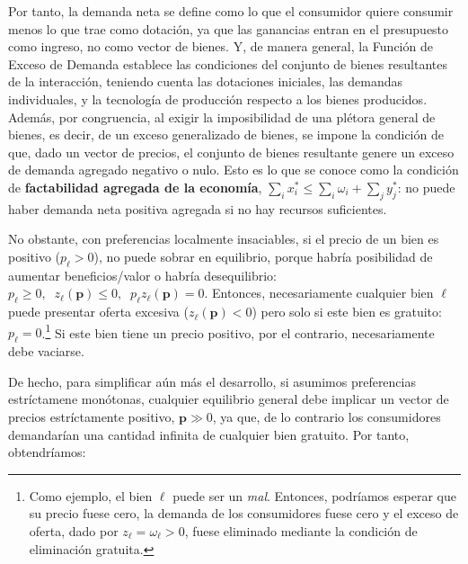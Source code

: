 \documentclass[10pt,a4paper]{article}
\begin{document}
Por tanto, la demanda neta se define como lo que el consumidor quiere consumir menos lo que trae como dotación, ya que las ganancias entran en el presupuesto como ingreso, no como vector de bienes. Y, de manera general, la Función de Exceso de Demanda establece las condiciones del conjunto de bienes resultantes de la interacción, teniendo cuenta las dotaciones iniciales, las demandas individuales, y la tecnología de producción respecto a los bienes producidos. Además, por congruencia, al exigir la imposibilidad de una plétora general de bienes, es decir, de un exceso generalizado de bienes, se impone la condición de que, dado un vector de precios, el conjunto de bienes resultante genere un exceso de demanda agregado negativo o nulo. Esto es lo que se conoce como la condición de \textbf{factabilidad agregada de la economía}, $\sum_{i}x_i^*\leq \sum_{i}\omega_i+\sum_jy_j^*$: no puede haber demanda neta positiva agregada si no hay recursos suficientes.

No obstante, con preferencias localmente insaciables, si el precio de un bien es positivo ($p_\ell>0$), no puede sobrar en equilibrio, porque habría posibilidad de aumentar beneficios/valor o habría desequilibrio: $p_\ell\geq0,\;\;z_\ell(\mathbf p)\leq 0,\;\; p_\ell z_\ell(\mathbf p)=0$. Entonces, necesariamente cualquier bien $\ell$ puede presentar oferta excesiva ($z_\ell(\mathbf p)<0$) pero solo si este bien es gratuito: $p_\ell=0$.\footnote{%
    Como ejemplo, el bien $\ell$ puede ser un \textit{mal}. Entonces, podríamos esperar que su precio fuese cero, la demanda de los consumidores fuese cero y el exceso de oferta, dado por $z_\ell=\omega_\ell>0$, fuese eliminado mediante la condición de eliminación gratuita.
} Si este bien tiene un precio positivo, por el contrario, necesariamente debe vaciarse. 

De hecho, para simplificar aún más el desarrollo, si asumimos preferencias estríctamene monótonas, cualquier equilibrio general debe implicar un vector de precios estríctamente positivo, $\mathbf p\gg0$, ya que, de lo contrario los consumidores demandarían una cantidad infinita de cualquier bien gratuito. Por tanto, obtendríamos:
\end{document}
